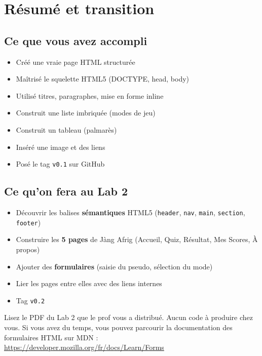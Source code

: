\documentclass[11pt,a4paper]{article}
\newcommand{\cmark}{\ding{51}}
\begin{document}
\section{Résumé et transition}

\subsection{Ce que vous avez accompli}

\begin{itemize}[leftmargin=*,nosep]
    \item Créé une vraie page HTML structurée \cmark
    \item Maîtrisé le squelette HTML5 (DOCTYPE, head, body) \cmark
    \item Utilisé titres, paragraphes, mise en forme inline \cmark
    \item Construit une liste imbriquée (modes de jeu) \cmark
    \item Construit un tableau (palmarès) \cmark
    \item Inséré une image et des liens \cmark
    \item Posé le tag \texttt{v0.1} sur GitHub \cmark
\end{itemize}

\subsection{Ce qu'on fera au Lab 2}

\begin{itemize}[leftmargin=*,nosep]
    \item Découvrir les balises \textbf{sémantiques} HTML5 (\texttt{header}, \texttt{nav}, \texttt{main}, \texttt{section}, \texttt{footer})
    \item Construire les \textbf{5 pages} de Jàng Afrig (Accueil, Quiz, Résultat, Mes Scores, À propos)
    \item Ajouter des \textbf{formulaires} (saisie du pseudo, sélection du mode)
    \item Lier les pages entre elles avec des liens internes
    \item Tag \texttt{v0.2}
\end{itemize}

\begin{infobox}
Lisez le PDF du Lab 2 que le prof vous a distribué. Aucun code à produire
chez vous. Si vous avez du temps, vous pouvez parcourir la documentation
des formulaires HTML sur MDN :\\
\url{https://developer.mozilla.org/fr/docs/Learn/Forms}
\end{infobox}
\end{document}
